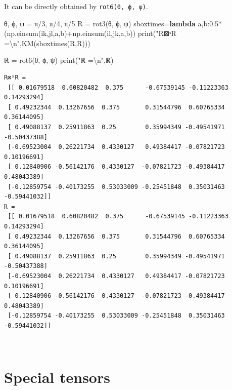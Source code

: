 \documentclass[
  letterpaper,
  DIV=11,
  numbers=noendperiod]{scrreprt}
\newenvironment{Shaded}{\begin{snugshade}}{\end{snugshade}}
\newcommand{\BuiltInTok}[1]{\textcolor[rgb]{0.00,0.23,0.31}{#1}}
\newcommand{\CharTok}[1]{\textcolor[rgb]{0.13,0.47,0.30}{#1}}
\newcommand{\DecValTok}[1]{\textcolor[rgb]{0.68,0.00,0.00}{#1}}
\newcommand{\FloatTok}[1]{\textcolor[rgb]{0.68,0.00,0.00}{#1}}
\newcommand{\KeywordTok}[1]{\textcolor[rgb]{0.00,0.23,0.31}{\textbf{#1}}}
\newcommand{\NormalTok}[1]{\textcolor[rgb]{0.00,0.23,0.31}{#1}}
\newcommand{\OperatorTok}[1]{\textcolor[rgb]{0.37,0.37,0.37}{#1}}
\newcommand{\StringTok}[1]{\textcolor[rgb]{0.13,0.47,0.30}{#1}}
\begin{document}
It can be directly obtained by \texttt{rot6(θ,\ ϕ,\ ψ)}.

\begin{Shaded}
\begin{Highlighting}[]
\NormalTok{θ, ϕ, ψ }\OperatorTok{=}\NormalTok{ π}\OperatorTok{/}\DecValTok{3}\NormalTok{, π}\OperatorTok{/}\DecValTok{4}\NormalTok{, π}\OperatorTok{/}\DecValTok{5}
\NormalTok{R }\OperatorTok{=}\NormalTok{ rot3(θ, ϕ, ψ)}
\NormalTok{sboxtimes}\OperatorTok{=}\KeywordTok{lambda}\NormalTok{ a,b:}\FloatTok{0.5}\OperatorTok{*}\NormalTok{(np.einsum(}\StringTok{\textquotesingle{}ik,jl\textquotesingle{}}\NormalTok{,a,b)}\OperatorTok{+}\NormalTok{np.einsum(}\StringTok{\textquotesingle{}il,jk\textquotesingle{}}\NormalTok{,a,b))}
\BuiltInTok{print}\NormalTok{(}\StringTok{"R⊠ˢR =}\CharTok{\textbackslash{}n}\StringTok{"}\NormalTok{,KM(sboxtimes(R,R)))}

\NormalTok{ℝ }\OperatorTok{=}\NormalTok{ rot6(θ, ϕ, ψ)}
\BuiltInTok{print}\NormalTok{(}\StringTok{"ℝ =}\CharTok{\textbackslash{}n}\StringTok{"}\NormalTok{,ℝ)}
\end{Highlighting}
\end{Shaded}

\begin{verbatim}
R⊠ˢR =
 [[ 0.01679518  0.60820482  0.375      -0.67539145 -0.11223363  0.14293294]
 [ 0.49232344  0.13267656  0.375       0.31544796  0.60765334  0.36144095]
 [ 0.49088137  0.25911863  0.25        0.35994349 -0.49541971 -0.50437388]
 [-0.69523004  0.26221734  0.4330127   0.49384417 -0.07821723  0.10196691]
 [ 0.12840906 -0.56142176  0.4330127  -0.07821723 -0.49384417  0.48043389]
 [-0.12859754 -0.40173255  0.53033009 -0.25451848  0.35031463 -0.59441032]]
ℝ =
 [[ 0.01679518  0.60820482  0.375      -0.67539145 -0.11223363  0.14293294]
 [ 0.49232344  0.13267656  0.375       0.31544796  0.60765334  0.36144095]
 [ 0.49088137  0.25911863  0.25        0.35994349 -0.49541971 -0.50437388]
 [-0.69523004  0.26221734  0.4330127   0.49384417 -0.07821723  0.10196691]
 [ 0.12840906 -0.56142176  0.4330127  -0.07821723 -0.49384417  0.48043389]
 [-0.12859754 -0.40173255  0.53033009 -0.25451848  0.35031463 -0.59441032]]
\end{verbatim}

\(\,\)

\chapter{Special tensors}\label{sec-special_tensors}
\end{document}
